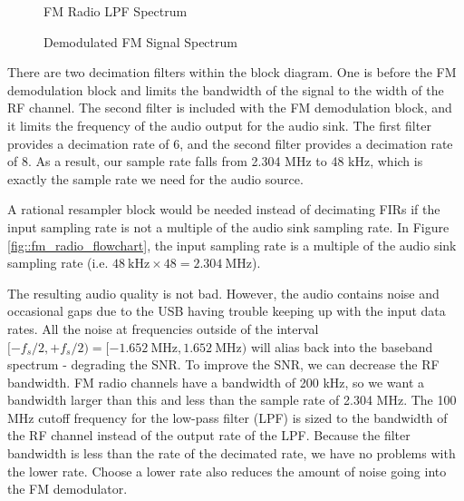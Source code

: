 \documentclass{article}
\begin{document}
\begin{figure}[H]
	\centerline{}
	\caption{FM Radio LPF Spectrum}
	\label{fig::fm_radio_lpf_spectrum}
\end{figure}

\begin{figure}[H]
	\centerline{}
	\caption{Demodulated FM Signal Spectrum}
	\label{fig::fm_radio_demod_spectrum}
\end{figure}

There are two decimation filters within the block diagram. One is before the FM demodulation block and limits the bandwidth of the signal to the width of the RF channel. The second filter is included with the FM demodulation block, and it limits the frequency of the audio output for the audio sink. The first filter provides a decimation rate of 6, and the second filter provides a decimation rate of 8. As a result, our sample rate falls from 2.304 MHz to 48 kHz, which is exactly the sample rate we need for the audio source.

A rational resampler block would be needed instead of decimating FIRs if the input sampling rate is not a multiple of the audio sink sampling rate. In Figure \ref{fig::fm_radio_flowchart}, the input sampling rate is a multiple of the audio sink sampling rate (i.e. $48\ \text{kHz} \times 48 = 2.304\ \text{MHz}$).

The resulting audio quality is not bad. However, the audio contains noise and occasional gaps due to the USB having trouble keeping up with the input data rates. All the noise at frequencies outside of the interval $[-f_s/2, +f_s/2) = [-1.652\ \text{MHz}, 1.652\ \text{MHz})$ will alias back into the baseband spectrum - degrading the SNR. To improve the SNR, we can decrease the RF bandwidth. FM radio channels have a bandwidth of 200 kHz, so we want a bandwidth larger than this and less than the sample rate of 2.304 MHz. The 100 MHz cutoff frequency for the low-pass filter (LPF) is sized to the bandwidth of the RF channel instead of the output rate of the LPF. Because the filter bandwidth is less than the rate of the decimated rate, we have no problems with the lower rate. Choose a lower rate also reduces the amount of noise going into the FM demodulator.
\end{document}

